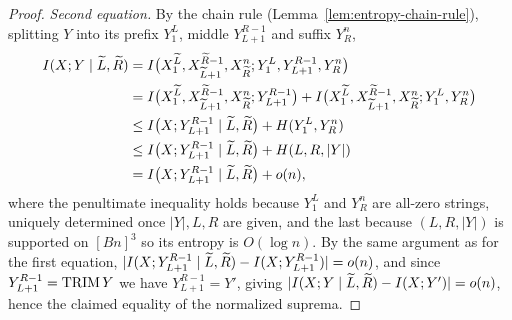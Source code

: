 \begin{proof}
  \emph{Second equation.} By the chain rule (Lemma~\ref{lem:entropy-chain-rule}),
  splitting $Y$ into its prefix $Y_1^L$, middle $Y_{L+1}^{R-1}$ and suffix
  $Y_R^n$,
  \begin{align*}
    I(X;Y\mid\widetilde L,\widetilde R)
      &= I\big(X_1^{\widetilde L},X_{\widetilde L+1}^{\widetilde R-1},X_{\widetilde R}^n;
          Y_1^L,Y_{L+1}^{R-1},Y_R^n\big)\\
      &= I\big(X_1^{\widetilde L},X_{\widetilde L+1}^{\widetilde R-1},X_{\widetilde R}^n;
          Y_{L+1}^{R-1}\big)
       + I\big(X_1^{\widetilde L},X_{\widetilde L+1}^{\widetilde R-1},X_{\widetilde R}^n;
          Y_1^L,Y_R^n\big)\\
      &\le I\big(X;Y_{L+1}^{R-1}\mid\widetilde L,\widetilde R\big)+H(Y_1^L,Y_R^n)\\
      &\le I\big(X;Y_{L+1}^{R-1}\mid\widetilde L,\widetilde R\big)+H(L,R,|Y|)\\
      &= I\big(X;Y_{L+1}^{R-1}\mid\widetilde L,\widetilde R\big)+o(n),
  \end{align*}
  where the penultimate inequality holds because $Y_1^L$ and $Y_R^n$ are all-zero
  strings, uniquely determined once $|Y|,L,R$ are given, and the last because
  $(L,R,|Y|)$ is supported on $[Bn]^3$ so its entropy is $O(\log n)$. By the same
  argument as for the first equation, $|I(X;Y_{L+1}^{R-1}\mid\widetilde L,\widetilde R)
   -I(X;Y_{L+1}^{R-1})|=o(n)$, and since $Y_{L+1}^{R-1}=\mathrm{TRIM}\,Y$ we have
  $Y_{L+1}^{R-1}=Y'$, giving
  $|I(X;Y\mid\widetilde L,\widetilde R)-I(X;Y')|=o(n)$, hence the claimed
  equality of the normalized suprema.
\end{proof}

